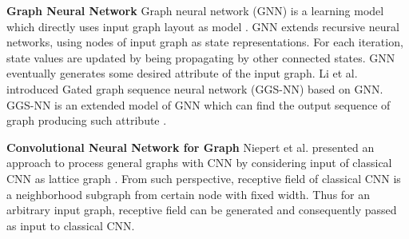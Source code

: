 \textbf{Graph Neural Network} Graph neural network (GNN) is a learning model which directly uses input graph layout as model \cite{gori2005new}.
GNN extends recursive neural networks, using nodes of input graph as state representations.
For each iteration, state values are updated by being propagating by other connected states.
GNN eventually generates some desired attribute of the input graph.
Li et al. introduced Gated graph sequence neural network (GGS-NN) based on GNN.
GGS-NN is an extended	 model of GNN which can find the output sequence of graph producing such attribute \cite{li2015gated}.

\textbf{Convolutional Neural Network for Graph}
Niepert et al. presented an approach to process general graphs with CNN by considering input of classical CNN as lattice graph \cite{niepert2016learning}.
From such perspective, receptive field of classical CNN is a neighborhood subgraph from certain node with fixed width.
Thus for an arbitrary input graph, receptive field can be generated and consequently passed as input to classical CNN.